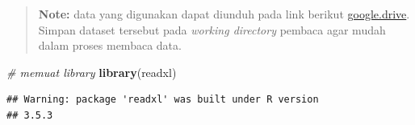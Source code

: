 \documentclass[]{book}
\newenvironment{Shaded}{\begin{snugshade}}{\end{snugshade}}
\newcommand{\KeywordTok}[1]{\textcolor[rgb]{0.13,0.29,0.53}{\textbf{#1}}}
\newcommand{\DataTypeTok}[1]{\textcolor[rgb]{0.13,0.29,0.53}{#1}}
\newcommand{\StringTok}[1]{\textcolor[rgb]{0.31,0.60,0.02}{#1}}
\newcommand{\CommentTok}[1]{\textcolor[rgb]{0.56,0.35,0.01}{\textit{#1}}}
\newcommand{\OperatorTok}[1]{\textcolor[rgb]{0.81,0.36,0.00}{\textbf{#1}}}
\newcommand{\NormalTok}[1]{#1}
\begin{document}
\begin{quote}
\textbf{Note: } data yang digunakan dapat diunduh pada link berikut
\href{https://drive.google.com/open?id=1-k_1Fkl2hWmI9ZohG9hWGrqKe4o8GArW}{google.drive}.
Simpan dataset tersebut pada \emph{working directory} pembaca agar mudah
dalam proses membaca data.
\end{quote}

\begin{Shaded}
\begin{Highlighting}[]
\CommentTok{# memuat library}
\KeywordTok{library}\NormalTok{(readxl)}
\end{Highlighting}
\end{Shaded}

\begin{verbatim}
## Warning: package 'readxl' was built under R version
## 3.5.3
\end{verbatim}

\begin{Shaded}
\end{Shaded}
\end{document}
